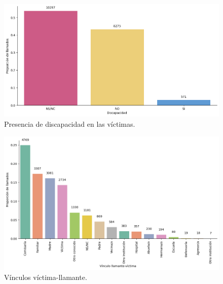 \documentclass[10 pt]{article}
\begin{document}
\begin{figure}[H]
\begin{center}
\includegraphics[scale=.4]{images/latex_victima_discapacidad.png}
\caption{Presencia de discapacidad en las víctimas.}
\label{discapacidad}
\end{center}
\end{figure}



\begin{figure}[H]
\begin{center}
\includegraphics[scale=.4]{images/latex_vinculo_llamante.png}
\caption{Vínculos víctima-llamante.}
\label{vinculollamante}
\end{center}
\end{figure}
\end{document}
